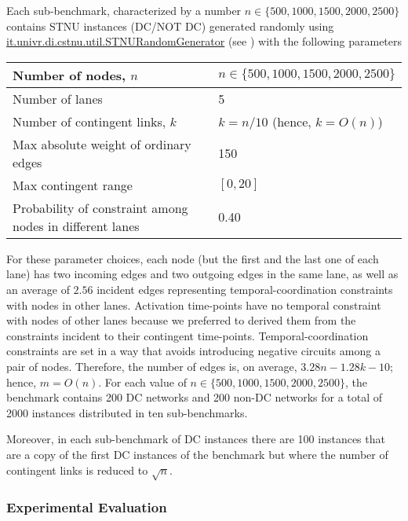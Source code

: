 \documentclass[a4paper,11pt]{article}
\begin{document}
Each sub-benchmark, characterized by a number $n\in\{500,1000,1500,2000,2500\}$ contains STNU instances (DC\slash NOT DC) generated randomly using\\ \href{http://profs.scienze.univr.it/~posenato/software/cstnu/apidocs/it/univr/di/cstnu/algorithms/STNURandomGenerator.html}{it.univr.di.cstnu.util.STNURandomGenerator}
(see ) with the following parameters
\begin{center}\begin{tabular}{|p{2.5in}|p{5.5cm}|} \hline
Number of nodes, $n$ & $n \in \{500, 1000, 1500, 2000, 2500\}$ \\ \hline
Number of lanes & 5\\ \hline
Number of contingent links, $k$ & $k = n / 10$ (hence, $k = O(n)$) \\ \hline
Max absolute weight of ordinary edges & 150 \\ \hline
Max contingent range & $[0,20]$ \\ \hline
Probability of constraint among nodes in different lanes & 0.40 \\ \hline
\end{tabular}\end{center}
For these parameter choices, each node (but the first and the last one of each lane) has two incoming edges and two outgoing edges in the same lane, as well as an average of $2.56$ incident edges representing temporal-coordination constraints with nodes in other lanes. Activation time-points have no temporal constraint with nodes of other lanes because we preferred to derived them from the constraints incident to their contingent time-points.
Temporal-coordination constraints are set in a way that avoids introducing negative circuits among a pair of nodes.
Therefore, the number of edges is, on average,  $3.28 n - 1.28 k - 10$; hence, $m = O(n)$.
For each value of $n \in \{500, 1000, 1500, 2000, 2500\}$, the benchmark contains 200 DC networks and 200 non-DC networks for a total of 2000 instances distributed in ten sub-benchmarks.

Moreover, in each sub-benchmark of DC instances there are 100 instances that are a copy of the first DC instances of the benchmark but where the number of contingent links is reduced to $\sqrt{n}$.
\newcommand{\rulTwenty}{RUL20}
\newcommand{\RULminus}{RUL$^-$}
\newcommand{\rulEighteen}{\RULminus}
\newcommand{\morrisFourteen}{Morris14}
\subsubsection{Experimental Evaluation}
\end{document}
